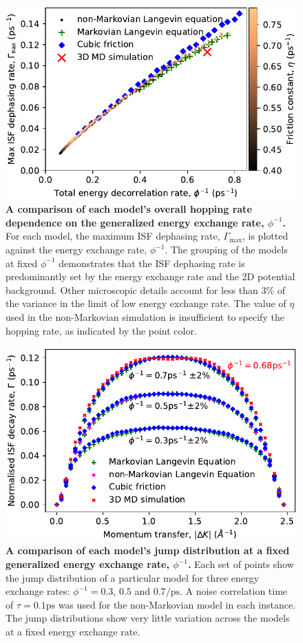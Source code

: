 \documentclass[7pt]{article}
\newcommand{\ps}{\si{\pico\second}}
\newcommand{\ips}{\si{\per\pico\second}}
\begin{document}
\begin{figure}
	\centering
	\includegraphics[width=1.0\columnwidth]{gamma_ttf}
	\caption{\textbf{A comparison of each model's overall hopping rate dependence on the generalized energy exchange rate, $\phi^{-1}$.} For each model, the maximum ISF dephasing rate, $\Gamma_{\text{max}}$, is plotted against the energy exchange rate, $\phi^{-1}$. The grouping of the models at fixed $\phi^{-1}$ demonstrates that the ISF dephasing rate is predominantly set by the energy exchange rate and the 2D potential background. Other microscopic details account for less than $3\%$ of the variance in the limit of low energy exchange rate. The value of $\eta$ used in the non-Markovian simulation is insufficient to specify the hopping rate, as indicated by the point color.} 
	\label{fig:gamma_ttf}
\end{figure}

\begin{figure}
	\centering
	\includegraphics[width=1.0\columnwidth]{jump_distribution}
	\caption{\textbf{A comparison of each model's jump distribution at a fixed generalized energy exchange rate, $\phi^{-1}$.} Each set of points show the jump distribution of a particular model for three energy exchange rates: $\phi^{-1}=0.3$, $0.5$ and $0.7\ips$. A noise correlation time of $\tau=0.1\ps$ was used for the non-Markovian model in each instance. The jump distributions show very little variation across the models at a fixed energy exchange rate.} 
	\label{fig:jump_distribution}
\end{figure}
\end{document}
